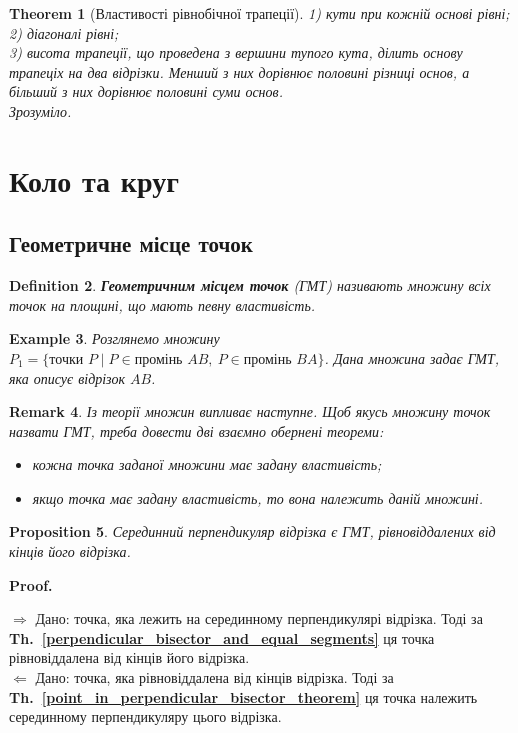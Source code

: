 \documentclass[a4paper, 10pt]{article}
\makeatletter
\def\rightproof{$\boxed{\Rightarrow}$ }
\def\leftproof{$\boxed{\Leftarrow}$ }
\theoremstyle{theoremdd}
\newtheorem{theorem}{Theorem}[subsection]
\theoremstyle{theoremdd}
\theoremstyle{theoremdd}
\newtheorem{definition}[theorem]{Definition}
\theoremstyle{theoremdd}
\theoremstyle{theoremdd}
\newtheorem{example}[theorem]{Example}
\theoremstyle{theoremdd}
\newtheorem{proposition}[theorem]{Proposition}
\theoremstyle{theoremdd}
\newtheorem{remark}[theorem]{Remark}
\theoremstyle{theoremdd}
\theoremstyle{theoremdd}
\newcommand\thref[1]{\textbf{Th.~\ref{#1}}}
\renewenvironment{proof}[1][Proof.\\]{\par
\pushQED{\hfill \qed}%
\normalfont \topsep6\p@\@plus6\p@\relax
\trivlist
\item\relax
{\bfseries
#1\@addpunct{.}}\hspace\labelsep\ignorespaces
}{%
\popQED\endtrivlist\@endpefalse
}
\makeatother
\begin{document}
\begin{theorem}[Властивості рівнобічної трапеції]
1) кути при кожній основі рівні;\\
2) діагоналі рівні;\\
3) висота трапеції, що проведена з вершини тупого кута, ділить основу трапеціх на два відрізки. Менший з них дорівнює половині різниці основ, а більший з них дорівнює половині суми основ.\\
\textit{Зрозуміло.}
\end{theorem}
\newpage

\section{Коло та круг}
\subsection{Геометричне місце точок}
\begin{definition}
\textbf{Геометричним місцем точок} (ГМТ) називають множину всіх точок на площині, що мають певну властивість.
\end{definition}

\begin{example}
Розглянемо множину $P_1 = \{\text{точки } P \mid P \in \text{промінь } AB,\ P \in \text{промінь } BA \}$. Дана множина задає ГМТ, яка описує відрізок $AB$.
\end{example}

\begin{remark}
Із теорії множин випливає наступне. Щоб якусь множину точок назвати ГМТ, треба довести дві взаємно обернені теореми:
\begin{itemize}[nosep,label={-}]
\item кожна точка заданої множини має задану властивість;
\item якщо точка має задану властивість, то вона належить даній множині. 
\end{itemize}
\end{remark}

\begin{proposition}
Серединний перпендикуляр відрізка є ГМТ, рівновіддалених від кінців його відрізка.
\end{proposition}

\begin{proof}
\rightproof Дано: точка, яка лежить на серединному перпендикулярі відрізка. Тоді за \thref{perpendicular_bisector_and_equal_segments} ця точка рівновіддалена від кінців його відрізка.
\bigskip \\
\leftproof Дано: точка, яка рівновіддалена від кінців відрізка. Тоді за \thref{point_in_perpendicular_bisector_theorem} ця точка належить серединному перпендикуляру цього відрізка.
\end{proof}
\end{document}
